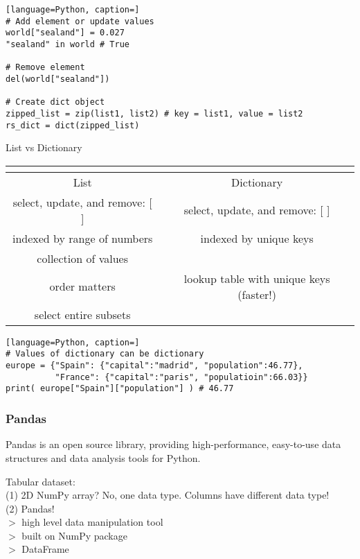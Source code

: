 \documentclass[12pt]{article}
\begin{document}
\begin{lstlisting}[language=Python, caption=]
# Add element or update values
world["sealand"] = 0.027
"sealand" in world # True

# Remove element
del(world["sealand"])

# Create dict object
zipped_list = zip(list1, list2) # key = list1, value = list2
rs_dict = dict(zipped_list)
\end{lstlisting}

\noindent
List vs Dictionary
\begin{table}[!ht]
\centering
\begin{tabular}{c | c  }
\multicolumn{1}{c}{} \\ [-10pt]
\hline\hline
List & Dictionary  \\
\hline
select, update, and remove: [ ] & select, update, and remove: [ ] \\
\hline
indexed by range of numbers & indexed by unique keys \\
\hline
collection of values &  \\
order matters & lookup table with unique keys (faster!) \\
select entire subsets & \\
\hline
\end{tabular}
\end{table}

\begin{lstlisting}[language=Python, caption=]
# Values of dictionary can be dictionary
europe = {"Spain": {"capital":"madrid", "population":46.77}, 
          "France": {"capital":"paris", "populatioin":66.03}}
print( europe["Spain"]["population"] ) # 46.77
\end{lstlisting}

\subsubsection{\normalsize Pandas}
Pandas is an open source library, providing high-performance, easy-to-use data structures and data analysis tools for Python. 

\noindent 
Tabular dataset: \\
(1) 2D NumPy array? No, one data type. Columns have different data type! \\
(2) Pandas! \\
$>$ high level data manipulation tool \\
$>$ built on NumPy package \\
$>$ DataFrame 
\end{document}
